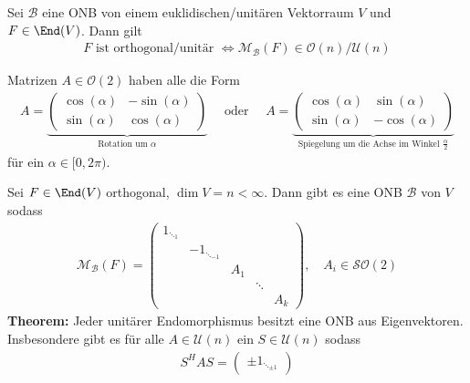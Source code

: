 Sei $\mathcal{B}$ eine ONB von einem euklidischen/unitären Vektorraum $V$ und $F \in \End(V)$. Dann gilt
\begin{align*}
    F \text{ ist orthogonal/unitär }  \Leftrightarrow \mathcal{M}_{\mathcal{B}}(F) \in \mathcal{O}(n)/ \mathcal{U}(n)
\end{align*}

Matrizen $A \in \mathcal{O}(2)$ haben alle die Form
\begin{align*}
    A = \underbrace{\begin{pmatrix}
        \cos(\alpha) & -\sin(\alpha)\\
        \sin(\alpha) & \cos(\alpha)
    \end{pmatrix}}_{\text{Rotation um $\alpha$}}
    \quad \text{ oder } \quad A = \underbrace{\begin{pmatrix}
        \cos(\alpha) & \sin(\alpha)\\
        \sin(\alpha) & -\cos(\alpha)
    \end{pmatrix}}_{\text{Spiegelung um die Achse im Winkel $\frac{\alpha}{2}$}}
\end{align*}
für ein $\alpha \in [0,2\pi)$. 


Sei $F \in \End(V)$ orthogonal, $\dim V = n < \infty$. Dann gibt es eine ONB $\mathcal{B}$ von $V$ sodass
\begin{align*}
    \mathcal{M}_{\mathcal{B}}(F) = \begin{pmatrix}
        1_{\ddots_{1}}\\
        & {-1}_{\ddots_{-1}}\\
        & & A_1\\
        & & & \ddots\\
        & & & & A_k
    \end{pmatrix}, \quad A_i \in \mathcal{SO}(2)
\end{align*}
\textbf{Theorem:} \quad Jeder unitärer Endomorphismus besitzt eine ONB aus Eigenvektoren. Insbesondere gibt es für alle $A \in \mathcal{U}(n)$ ein $S \in \mathcal{U}(n)$ sodass 
\begin{align*}
    S^H A S = \begin{pmatrix}
        \pm 1_{\ddots_{\pm 1}}
    \end{pmatrix}
\end{align*}